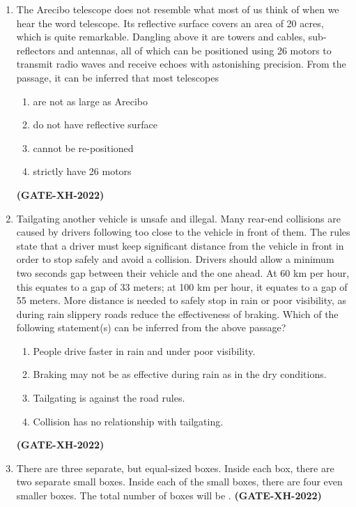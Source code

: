 \documentclass[journal]{IEEEtran}
\begin{document}
\begin{enumerate}
\item The Arecibo telescope does not resemble what most of us think of when we hear the word telescope. Its reflective surface covers an area of 20 acres, which is quite remarkable. Dangling above it are towers and cables, sub-reflectors and antennas, all of which can be positioned using 26 motors to transmit radio waves and receive echoes with astonishing precision. From the passage, it can be inferred that most telescopes
\begin{enumerate}
\item are not as large as Arecibo
\item do not have reflective surface
\item cannot be re-positioned
\item strictly have 26 motors
\end{enumerate}
\hfill\textbf{(GATE-XH-2022)}

\item Tailgating another vehicle is unsafe and illegal. Many rear-end collisions are caused by drivers following too close to the vehicle in front of them. The rules state that a driver must keep significant distance from the vehicle in front in order to stop safely and avoid a collision. Drivers should allow a minimum two seconds gap between their vehicle and the one ahead. At 60 km per hour, this equates to a gap of 33 meters; at 100 km per hour, it equates to a gap of 55 meters. More distance is needed to safely stop in rain or poor visibility, as during rain slippery roads reduce the effectiveness of braking. Which of the following statement(s) can be inferred from the above passage?
\begin{enumerate}
\item People drive faster in rain and under poor visibility.
\item Braking may not be as effective during rain as in the dry conditions.
\item Tailgating is against the road rules.
\item Collision has no relationship with tailgating.
\end{enumerate}
\hfill\textbf{(GATE-XH-2022)}

\item There are three separate, but equal-sized boxes. Inside each box, there are two separate small boxes. Inside each of the small boxes, there are four even smaller boxes. The total number of boxes will be \underline{\hspace{3cm}} .
\hfill\textbf{(GATE-XH-2022)}
\vspace{0.2cm}

\end{enumerate}
\end{document}
